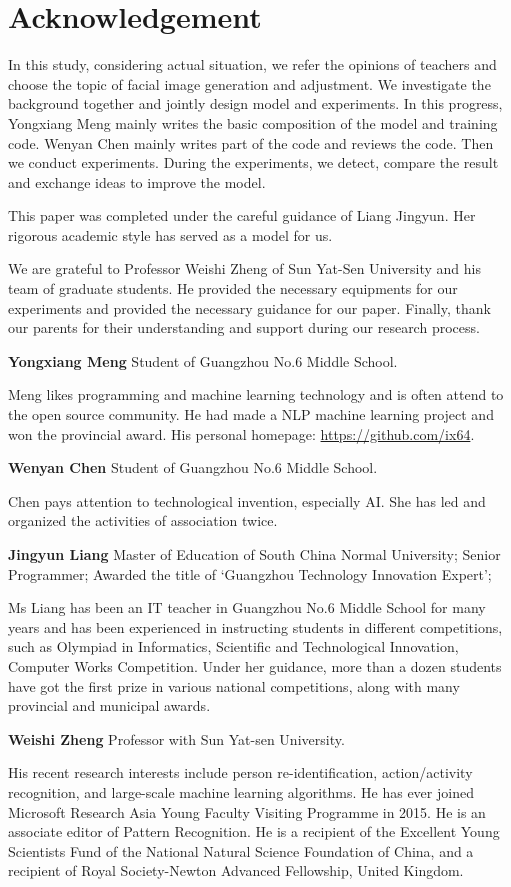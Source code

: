 \section*{Acknowledgement}

In this study, considering actual situation,
    we refer the opinions of teachers and choose the topic of facial image generation and adjustment.
We investigate the background together and jointly design model and experiments.
In this progress, Yongxiang Meng mainly writes the basic composition of the model and training code.
Wenyan Chen mainly writes part of the code and reviews the code.
Then we conduct experiments.
During the experiments, we detect, compare the result and exchange ideas to improve the model.

This paper was completed under the careful guidance of Liang Jingyun.
Her rigorous academic style has served as a model for us.

We are grateful to Professor Weishi Zheng of Sun Yat-Sen University and his team of graduate students.
He provided the necessary equipments for our experiments and provided the necessary guidance for our paper.
Finally, thank our parents for their understanding and support during our research process.

\vspace{4ex}


\textbf{Yongxiang Meng}  Student of Guangzhou No.6 Middle School.

Meng likes programming and machine learning technology and is often attend to the open source community.
He had made a NLP machine learning project and won the provincial award.
His personal homepage: \url{https://github.com/ix64}.


\textbf{Wenyan Chen}  Student of Guangzhou No.6 Middle School.

Chen pays attention to technological invention, especially AI.
She has led and organized the activities of association twice.

\textbf{Jingyun Liang}  Master of Education of South China Normal University;
Senior Programmer;
Awarded the title of ‘Guangzhou Technology Innovation Expert’;

Ms Liang has been an IT teacher in Guangzhou No.6 Middle School for many years and has been experienced in instructing students in different competitions,
    such as Olympiad in Informatics,
    Scientific and Technological Innovation, Computer Works Competition.
Under her guidance, more than a dozen students have got the first prize in various national competitions,
    along with many provincial and municipal awards.


\textbf{Weishi Zheng}  Professor with Sun Yat-sen University.

His recent research interests include person re-identification, action/activity recognition, and large-scale machine learning algorithms.
He has ever joined Microsoft Research Asia Young Faculty Visiting Programme in 2015.
He is an associate editor of Pattern Recognition.
He is a recipient of the Excellent Young Scientists Fund of the National Natural Science Foundation of China,
    and a recipient of Royal Society-Newton Advanced Fellowship, United Kingdom.

